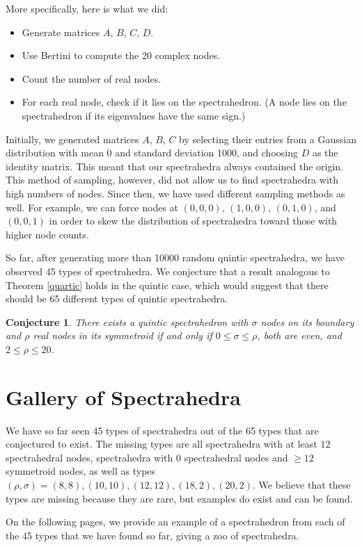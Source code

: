 \documentclass[12pt]{amsart}
\theoremstyle{plain}
\newtheorem{conjecture}[theorem]{Conjecture}
\theoremstyle{definition}
\begin{document}
More specifically, here is what we did:
\begin{itemize}
	\item Generate matrices $A$, $B$, $C$, $D$.
	\item Use Bertini to compute the 20 complex nodes.
	\item Count the number of real nodes.
	\item For each real node, check if it lies on the spectrahedron. (A node
		lies on the spectrahedron if its eigenvalues have the same sign.)
\end{itemize}

Initially, we generated matrices $A$, $B$, $C$ by selecting their entries from
a Gaussian distribution with mean 0 and standard deviation 1000, and choosing
$D$ as the identity matrix. This meant that our spectrahedra always contained
the origin. This method of sampling, however, did not allow us to find
spectrahedra with high numbers of nodes. Since then, we have used different
sampling methods as well. For example, we can force nodes at $(0,0,0)$,
$(1,0,0)$, $(0,1,0)$, and $(0,0,1)$ in order to skew the distribution of
spectrahedra toward those with higher node counts.

So far, after generating more than 10000 random quintic spectrahedra, we have
observed 45 types of spectrahedra. 
We conjecture that a result analogous to Theorem \ref{quartic} holds in the
quintic case, which would suggest that there should be 65 different types of
quintic spectrahedra.
\begin{conjecture} 
	There exists a quintic spectrahedron with $\sigma$ nodes on its boundary and
	$\rho$ real nodes in its symmetroid if and only if $0 \le \sigma \le \rho$,
	both are even, and $2 \le \rho \le 20$.
\end{conjecture} 

\section{Gallery of Spectrahedra}

We have so far seen 45 types of spectrahedra out of the 65 types that are
conjectured to exist. The missing types are all spectrahedra with 
at least $12$ spectrahedral nodes, spectrahedra with $0$ spectrahedral nodes
and $\ge 12$ symmetroid nodes, as well as types 
$(\rho,\sigma) = (8,8), (10,10), (12,12), (18,2), (20,2)$.
We believe that these types are missing because they are rare, but examples do
exist and can be found.


On the following pages, we provide an example of a spectrahedron from each of
the 45 types that we have found so far, giving a zoo of spectrahedra.
\end{document}
